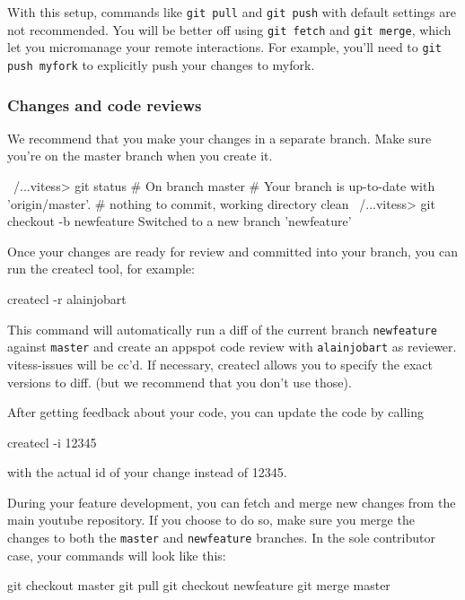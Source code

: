With this setup, commands like {\tt git pull} and {\tt git push} with default settings
are not recommended. You will be better off using {\tt git fetch} and {\tt git merge},
which let you micromanage your remote interactions. For example, you'll need to
{\tt git push myfork} to explicitly push your changes to myfork.

\subsubsection{Changes and code reviews}\hypertarget{changes-and-code-reviews}{}\label{changes-and-code-reviews}

We recommend that you make your changes in a separate branch.
Make sure you're on the master branch when you create it.

\begin{codesample2}
  ~/...vitess> git status
  # On branch master
  # Your branch is up-to-date with 'origin/master'.
  #
  nothing to commit, working directory clean
  ~/...vitess> git checkout -b newfeature
  Switched to a new branch 'newfeature'
\end{codesample2}

Once your changes are ready for review and committed into your branch,
you can run the createcl tool, for example:
\begin{codesample2}
  createcl -r alainjobart
\end{codesample2}

This command will automatically run a diff of the current branch {\tt newfeature}
against {\tt master} and create an appspot code review with {\tt alainjobart} as
reviewer. vitess-issues will be cc'd. If necessary, createcl allows you to
specify the exact versions to diff. (but we recommend that you don't use those).

After getting feedback about your code, you can update the code by calling

\begin{codesample2}
  createcl -i 12345
\end{codesample2}

with the actual id of your change instead of 12345.

During your feature development, you can fetch and merge new changes from the main youtube repository.
If you choose to do so, make sure you merge the changes to both the {\tt master} and {\tt newfeature} branches.
In the sole contributor case, your commands will look like this:

\begin{codesample2}
  git checkout master
  git pull
  git checkout newfeature
  git merge master
\end{codesample2}




